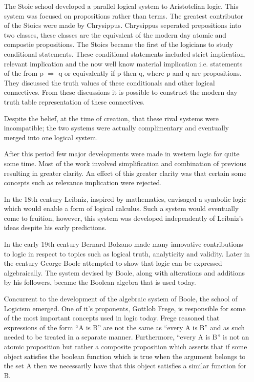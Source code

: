 The Stoic school developed a parallel logical system to Aristotelian logic. This system was focused on propositions rather than terms. The greatest contributor of the Stoics were made by Chrysippus. Chrysippus seperated prepositions into two classes, these classes are the equivalent of the modern day atomic and compostie propositions. The Stoics became the first of the logicians to study conditional statements. These conditional statements included strict implication, relevant implication and the now well know material implication i.e. statements of the from p $\Rightarrow$ q or equivalently if p then q, where p and q are propositions. They discussed the truth values of these conditionals and other logical connectives. From these discussions it is possible to construct the modern day truth table representation of these connectives. 

Despite the belief, at the time of creation, that these rival systems were incompatible; the two systems were actually complimentary and eventually merged into one logical system.

After this period few major developments were made in western logic for quite some time. Most of the work involved simplification and combination of previous resulting in greater clarity. An effect of this greater clarity was that certain some concepts such as relevance implication were rejected. \cite{KingShapiro95} 

In the 18th century Leibniz, inspired by mathematics, envisaged a symbolic logic which would enable a form of logical calculus. Such a system would eventually come to fruition, however, this system was developed independently of Leibniz's ideas despite his early predictions. \cite{sep-leibniz-logic-influence}

In the early 19th century Bernard Bolzano made many innovative contributions to logic in respect to topics such as logical truth, analyticity and validity. Later in the century George Boole attempted to show that logic can be expressed algebraically. The system devised by Boole, along with alterations and additions by his followers, became the Boolean algebra that is used today.

Concurrent to the development of the algebraic system of Boole, the school of Logicism emerged. One of it's proponents,  Gottlob Frege, is responsible for some of the most important concepts used in logic today. Frege reasoned that expressions of the form “A is B” are not the same as “every A is B” and as such needed to be treated in a separate manner. Furthermore, “every A is B” is not an atomic proposition but rather a composite proposition which asserts that if some object satisfies the boolean function which is true when the argument belongs to the set A then we necessarily have that this object satisfies a similar function for B. 

